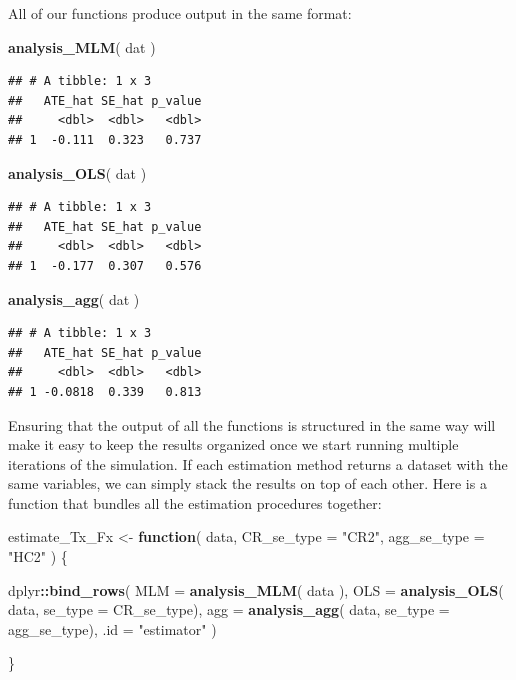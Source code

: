 \documentclass[
]{book}
\newenvironment{Shaded}{\begin{snugshade}}{\end{snugshade}}
\newcommand{\AttributeTok}[1]{\textcolor[rgb]{0.13,0.29,0.53}{#1}}
\newcommand{\ControlFlowTok}[1]{\textcolor[rgb]{0.13,0.29,0.53}{\textbf{#1}}}
\newcommand{\FunctionTok}[1]{\textcolor[rgb]{0.13,0.29,0.53}{\textbf{#1}}}
\newcommand{\NormalTok}[1]{#1}
\newcommand{\OtherTok}[1]{\textcolor[rgb]{0.56,0.35,0.01}{#1}}
\newcommand{\SpecialCharTok}[1]{\textcolor[rgb]{0.81,0.36,0.00}{\textbf{#1}}}
\newcommand{\StringTok}[1]{\textcolor[rgb]{0.31,0.60,0.02}{#1}}
\begin{document}
All of our functions produce output in the same format:

\begin{Shaded}
\begin{Highlighting}[]
\FunctionTok{analysis\_MLM}\NormalTok{( dat )}
\end{Highlighting}
\end{Shaded}

\begin{verbatim}
## # A tibble: 1 x 3
##   ATE_hat SE_hat p_value
##     <dbl>  <dbl>   <dbl>
## 1  -0.111  0.323   0.737
\end{verbatim}

\begin{Shaded}
\begin{Highlighting}[]
\FunctionTok{analysis\_OLS}\NormalTok{( dat )}
\end{Highlighting}
\end{Shaded}

\begin{verbatim}
## # A tibble: 1 x 3
##   ATE_hat SE_hat p_value
##     <dbl>  <dbl>   <dbl>
## 1  -0.177  0.307   0.576
\end{verbatim}

\begin{Shaded}
\begin{Highlighting}[]
\FunctionTok{analysis\_agg}\NormalTok{( dat )}
\end{Highlighting}
\end{Shaded}

\begin{verbatim}
## # A tibble: 1 x 3
##   ATE_hat SE_hat p_value
##     <dbl>  <dbl>   <dbl>
## 1 -0.0818  0.339   0.813
\end{verbatim}

Ensuring that the output of all the functions is structured in the same way will make it easy to keep the results organized once we start running multiple iterations of the simulation.
If each estimation method returns a dataset with the same variables, we can simply stack the results on top of each other.
Here is a function that bundles all the estimation procedures together:

\begin{Shaded}
\begin{Highlighting}[]
\NormalTok{estimate\_Tx\_Fx }\OtherTok{\textless{}{-}} \ControlFlowTok{function}\NormalTok{(}
\NormalTok{    data, }
    \AttributeTok{CR\_se\_type =} \StringTok{"CR2"}\NormalTok{, }\AttributeTok{agg\_se\_type =} \StringTok{"HC2"}
\NormalTok{) \{}
  
\NormalTok{  dplyr}\SpecialCharTok{::}\FunctionTok{bind\_rows}\NormalTok{(}
    \AttributeTok{MLM =} \FunctionTok{analysis\_MLM}\NormalTok{( data ),}
    \AttributeTok{OLS =} \FunctionTok{analysis\_OLS}\NormalTok{( data, }\AttributeTok{se\_type =}\NormalTok{ CR\_se\_type),}
    \AttributeTok{agg =} \FunctionTok{analysis\_agg}\NormalTok{( data, }\AttributeTok{se\_type =}\NormalTok{ agg\_se\_type),}
    \AttributeTok{.id =} \StringTok{"estimator"}
\NormalTok{  )}
  
\NormalTok{\}}
\end{Highlighting}
\end{Shaded}
\end{document}
